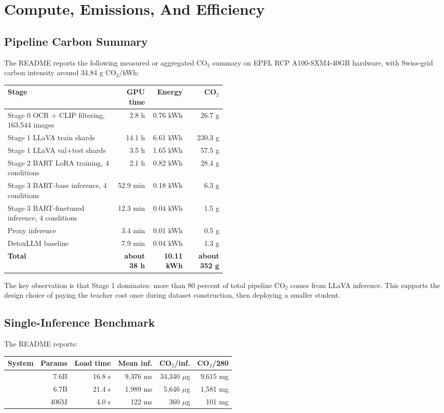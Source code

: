\documentclass[11pt,a4paper]{article}
\newcommand{\code}[1]{\texttt{\detokenize{#1}}}
\newcommand{\cootwo}{CO$_2$}
\begin{document}
\section{Compute, Emissions, And Efficiency}

\subsection{Pipeline Carbon Summary}

The README reports the following measured or aggregated \cootwo{} summary on EPFL RCP A100-SXM4-40GB hardware, with Swiss-grid carbon intensity around 34.84 g \cootwo{}/kWh:

\begin{longtable}{p{0.50\linewidth}rrr}
\toprule
\textbf{Stage} & \textbf{GPU time} & \textbf{Energy} & \textbf{\cootwo{}}\\
\midrule
Stage 0 OCR + CLIP filtering, 163,544 images & 2.8 h & 0.76 kWh & 26.7 g\\
Stage 1 LLaVA train shards & 14.1 h & 6.61 kWh & 230.3 g\\
Stage 1 LLaVA val+test shards & 3.5 h & 1.65 kWh & 57.5 g\\
Stage 2 BART LoRA training, 4 conditions & 2.1 h & 0.82 kWh & 28.4 g\\
Stage 3 BART-base inference, 4 conditions & 52.9 min & 0.18 kWh & 6.3 g\\
Stage 3 BART-finetuned inference, 4 conditions & 12.3 min & 0.04 kWh & 1.5 g\\
Proxy inference & 3.4 min & 0.01 kWh & 0.5 g\\
DetoxLLM baseline & 7.9 min & 0.04 kWh & 1.3 g\\
\textbf{Total} & \textbf{about 38 h} & \textbf{10.11 kWh} & \textbf{about 352 g}\\
\bottomrule
\end{longtable}

The key observation is that Stage 1 dominates: more than 80 percent of total pipeline \cootwo{} comes from LLaVA inference. This supports the design choice of paying the teacher cost once during dataset construction, then deploying a smaller student.

\subsection{Single-Inference Benchmark}

The README reports:

\begin{longtable}{lrrrrr}
\toprule
\textbf{System} & \textbf{Params} & \textbf{Load time} & \textbf{Mean inf.} & \textbf{\cootwo{}/inf.} & \textbf{\cootwo{}/280}\\
\midrule
\code{llava_teacher} & 7.6B & 16.8 s & 9,376 ms & 34,340 \(\mu\)g & 9,615 mg\\
\code{detoxllm} & 6.7B & 21.4 s & 1,989 ms & 5,646 \(\mu\)g & 1,581 mg\\
\code{bart_finetuned} & 406M & 4.0 s & 122 ms & 360 \(\mu\)g & 101 mg\\
\bottomrule
\end{longtable}
\end{document}
